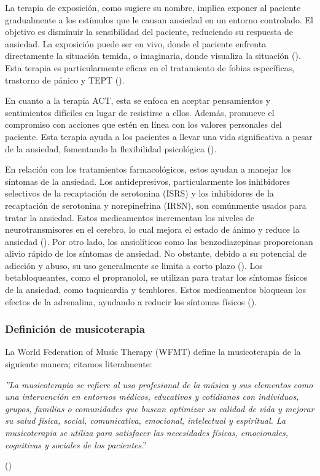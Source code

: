 La terapia de exposición, como sugiere su nombre, implica exponer al paciente gradualmente a los estímulos que le causan 	ansiedad en un entorno controlado. El objetivo es disminuir la sensibilidad del paciente, reduciendo su respuesta de ansiedad. La exposición puede ser en vivo, donde el paciente enfrenta directamente la situación temida, o imaginaria, donde visualiza la situación (\cite{CRASKE:2008}). Esta terapia es particularmente eficaz en el tratamiento de fobias específicas, trastorno de pánico y TEPT (\cite{POWERS:2010}).

En cuanto a la terapia ACT, esta se enfoca en aceptar pensamientos y sentimientos difíciles en lugar de resistirse a ellos. Además, promueve el compromiso con acciones que estén en línea con los valores personales del paciente. Esta terapia ayuda a los pacientes a llevar una vida significativa a pesar de la ansiedad, fomentando la flexibilidad psicológica (\cite{HAYES:2012}).

En relación con los tratamientos farmacológicos, estos ayudan a manejar los síntomas de la ansiedad. Los antidepresivos, particularmente los inhibidores selectivos de la recaptación de serotonina (ISRS) y los inhibidores de la recaptación de serotonina y norepinefrina (IRSN), son comúnmente usados para tratar la ansiedad. Estos medicamentos incrementan los niveles de neurotransmisores en el cerebro, lo cual mejora el estado de ánimo y reduce la ansiedad (\cite{BALDWIN:2014}). Por otro lado, los ansiolíticos como las benzodiazepinas proporcionan alivio rápido de los síntomas de ansiedad. No obstante, debido a su potencial de adicción y abuso, su uso generalmente se limita a corto plazo (\cite{FOND:2023}). Los betabloqueantes, como el propranolol, se utilizan para tratar los síntomas físicos de la ansiedad, como taquicardia y temblores. Estos medicamentos bloquean los efectos de la adrenalina, ayudando a reducir los síntomas físicos (\cite{STEENEN:2016}).

\subsubsection{Definición de musicoterapia}

La World Federation of Music Therapy (WFMT) define la musicoterapia de la siguiente manera; citamos literalmente: 

\begin{adjustwidth}{100pt}{0pt}
\textit{''La musicoterapia se refiere al uso profesional de la música y sus elementos como una intervención en entornos médicos, educativos y cotidianos con individuos, grupos, familias o comunidades que buscan optimizar su calidad de vida y mejorar su salud física, social, comunicativa, emocional, intelectual y espiritual. La musicoterapia se utiliza para satisfacer las necesidades físicas, emocionales, cognitivas y sociales de los pacientes}.'' \\
\begin{flushright}
	\vspace{-30px}
	(\cite{WFMT:2024})
\end{flushright}
\end{adjustwidth}

